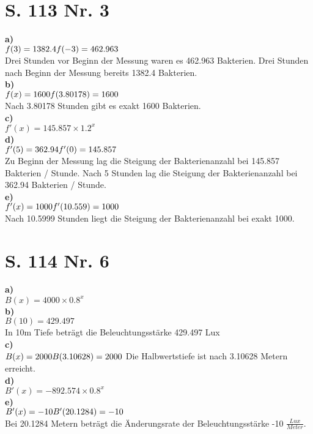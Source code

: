 \documentclass[12pt, a4paper]{report}
\begin{document}
	\chapter{S. 113 Nr. 3}
	\textbf{a)} \\
	$f(3) = 1382.4 \\ f(-3) = 462.963$ \\
	Drei Stunden vor Beginn der Messung waren es 462.963 Bakterien.
	Drei Stunden nach Beginn der Messung bereits 1382.4 Bakterien. \\
	\textbf{b)} \\
	$f(x) = 1600 \\ f(3.80178) = 1600$ \\
	Nach 3.80178 Stunden gibt es exakt 1600 Bakterien. \\
	\textbf{c)} \\
	$f'(x) = 145.857 \times 1.2^x$ \\
	\textbf{d)} \\
	$f'(5) = 362.94 \\ f'(0) = 145.857$ \\
	Zu Beginn der Messung lag die Steigung der Bakterienanzahl bei 145.857 Bakterien / Stunde.
	Nach 5 Stunden lag die Steigung der Bakterienanzahl bei 362.94 Bakterien / Stunde.\\
	\textbf{e)} \\
	$f'(x) = 1000 \\ f'(10.559) = 1000$ \\
	Nach 10.5999 Stunden liegt die Steigung der Bakterienanzahl bei exakt 1000.
	\chapter{S. 114 Nr. 6}
	\textbf{a)} \\
	$B(x) = 4000 \times 0.8^x$ \\
	\textbf{b)} \\
	$B(10) = 429.497$ \\
	In 10m Tiefe beträgt die Beleuchtungsstärke 429.497 Lux \\
	\textbf{c)} \\
	$B(x) = 2000 \\ B(3.10628) = 2000 \\$
	Die Halbwertstiefe ist nach 3.10628 Metern erreicht. \\
	\textbf{d)} \\
	$B'(x) = -892.574 \times 0.8^x$ \\
	\textbf{e)} \\
	$B'(x) = -10 \\ B'(20.1284) = -10$ \\
	Bei 20.1284 Metern beträgt die Änderungsrate der Beleuchtungsstärke -10 $\frac{Lux}{Meter}$.
\end{document}
